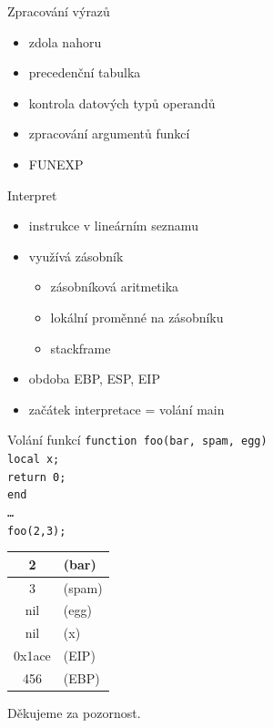 \documentclass{beamer}
\begin{document}
\begin{frame}{Zpracování výrazů}
  \begin{itemize}
  \item zdola nahoru
  \item precedenční tabulka
  \item kontrola datových typů operandů
  \item zpracování argumentů funkcí
  \item FUNEXP
  \end{itemize}
\end{frame}

\begin{frame}{Interpret}
  \begin{itemize}
  \item instrukce v lineárním seznamu
  \item využívá zásobník
    \begin{itemize}
    \item zásobníková aritmetika
    \item lokální proměnné na zásobníku
    \item stackframe
    \end{itemize}
  \item obdoba EBP, ESP, EIP
  \item začátek interpretace = volání main
  \end{itemize}
\end{frame}

\begin{frame}{Volání funkcí}
  \tt{function foo(bar, spam, egg)\\\hspace{2em} local x;\\\hspace{2em} return 0;\\end}\\
  \ldots\\
  \tt{foo(2,3);}\\
  \begin{center}
  \begin{tabular}{|c l|}
    \hline
    2 & (bar)\\\hline
    3 & (spam)\\\hline
    nil & (egg)\\\hline
    nil & (x)\\\hline
    0x1ace & (EIP)\\\hline
    456 & (EBP)\\\hline
  \end{tabular}
  \end{center}
\end{frame}

\begin{frame}{}
  \begin{center}
    Děkujeme za pozornost.
  \end{center}
\end{frame}
\end{document}
